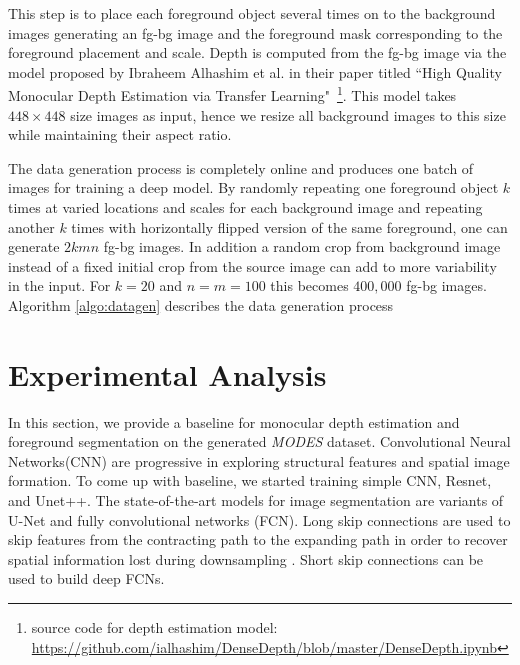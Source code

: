 \documentclass[review]{cvpr}
\begin{document}
This step is to place each foreground object several times on to the background images generating an fg-bg image and the foreground mask corresponding to the foreground placement and scale. Depth is computed from the fg-bg image via the model proposed by Ibraheem Alhashim et al. in their paper titled ``High Quality Monocular Depth Estimation via Transfer Learning"~\cite{alhashim2018high}\footnote{source code for depth estimation model: \url{https://github.com/ialhashim/DenseDepth/blob/master/DenseDepth.ipynb}}. This model takes $448\times448$ size images as input, hence we resize all background images to this size while maintaining their aspect ratio.

The data generation process is completely online and produces one batch of images for training a deep model. By randomly repeating one foreground object $k$ times at varied locations and scales for each background image and repeating another $k$ times with horizontally flipped version of the same foreground, one can generate $2kmn$ fg-bg images. In addition a random crop from background image instead of a fixed initial crop from the source image can add to more variability in the input. For $k=20$ and $n=m=100$ this becomes $400,000$ fg-bg images. Algorithm \ref{algo:datagen} describes the data generation process


\section{Experimental Analysis}
In this section, we provide a baseline for monocular depth estimation and foreground segmentation on the generated \textit{MODES} dataset. Convolutional Neural Networks(CNN) are progressive in exploring structural features and spatial image formation. To come up with baseline, we started  training simple CNN, Resnet, and Unet++. The state-of-the-art models for image segmentation are variants of U-Net and fully convolutional networks (FCN)\cite{drozdzal2016importance}. Long skip connections are used to skip features from the contracting path to the expanding path in order to recover spatial information lost during downsampling \cite{zhou2019unet++}. Short skip connections can be used to build deep FCNs. 
\end{document}
